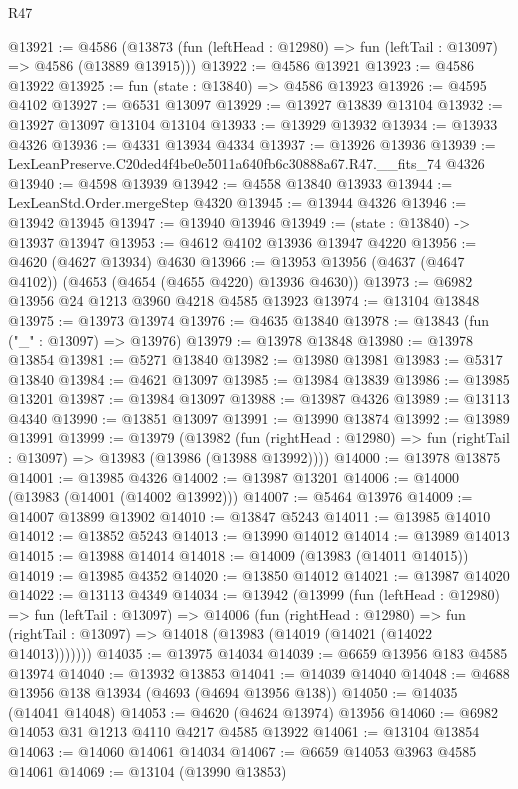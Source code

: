 \begin{lexlean}{R47}
\begin{coremodule}
@13921 := @4586
    (@13873 (fun (leftHead : @12980) => fun (leftTail : @13097) => @4586 (@13889 @13915)))
@13922 := @4586 @13921
@13923 := @4586 @13922
@13925 := fun (state : @13840) => @4586 @13923
@13926 := @4595 @4102
@13927 := @6531 @13097
@13929 := @13927 @13839 @13104
@13932 := @13927 @13097 @13104 @13104
@13933 := @13929 @13932
@13934 := @13933 @4326
@13936 := @4331 @13934 @4334
@13937 := @13926 @13936
@13939 := LexLeanPreserve.C20ded4f4be0e5011a640fb6c30888a67.R47.__fits_74 @4326
@13940 := @4598 @13939
@13942 := @4558 @13840 @13933
@13944 := LexLeanStd.Order.mergeStep @4320
@13945 := @13944 @4326
@13946 := @13942 @13945
@13947 := @13940 @13946
@13949 := (state : @13840) -> @13937 @13947
@13953 := @4612 @4102 @13936 @13947 @4220
@13956 := @4620 (@4627 @13934) @4630
@13966 := @13953 @13956 (@4637 (@4647 @4102)) (@4653 (@4654 (@4655 @4220) @13936 @4630))
@13973 := @6982 @13956 @24 @1213 @3960 @4218 @4585 @13923
@13974 := @13104 @13848
@13975 := @13973 @13974
@13976 := @4635 @13840
@13978 := @13843 (fun ("_" : @13097) => @13976)
@13979 := @13978 @13848
@13980 := @13978 @13854
@13981 := @5271 @13840
@13982 := @13980 @13981
@13983 := @5317 @13840
@13984 := @4621 @13097
@13985 := @13984 @13839
@13986 := @13985 @13201
@13987 := @13984 @13097
@13988 := @13987 @4326
@13989 := @13113 @4340
@13990 := @13851 @13097
@13991 := @13990 @13874
@13992 := @13989 @13991
@13999 := @13979
    (@13982
      (fun (rightHead : @12980) => fun (rightTail : @13097) => @13983 (@13986 (@13988 @13992))))
@14000 := @13978 @13875
@14001 := @13985 @4326
@14002 := @13987 @13201
@14006 := @14000 (@13983 (@14001 (@14002 @13992)))
@14007 := @5464 @13976
@14009 := @14007 @13899 @13902
@14010 := @13847 @5243
@14011 := @13985 @14010
@14012 := @13852 @5243
@14013 := @13990 @14012
@14014 := @13989 @14013
@14015 := @13988 @14014
@14018 := @14009 (@13983 (@14011 @14015))
@14019 := @13985 @4352
@14020 := @13850 @14012
@14021 := @13987 @14020
@14022 := @13113 @4349
@14034 := @13942
    (@13999
      (fun (leftHead : @12980) =>
      fun (leftTail : @13097) =>
      @14006
        (fun (rightHead : @12980) =>
        fun (rightTail : @13097) => @14018 (@13983 (@14019 (@14021 (@14022 @14013)))))))
@14035 := @13975 @14034
@14039 := @6659 @13956 @183 @4585 @13974
@14040 := @13932 @13853
@14041 := @14039 @14040
@14048 := @4688 @13956 @138 @13934 (@4693 (@4694 @13956 @138))
@14050 := @14035 (@14041 @14048)
@14053 := @4620 (@4624 @13974) @13956
@14060 := @6982 @14053 @31 @1213 @4110 @4217 @4585 @13922
@14061 := @13104 @13854
@14063 := @14060 @14061 @14034
@14067 := @6659 @14053 @3963 @4585 @14061
@14069 := @13104 (@13990 @13853)

\end{coremodule}
\end{lexlean}
